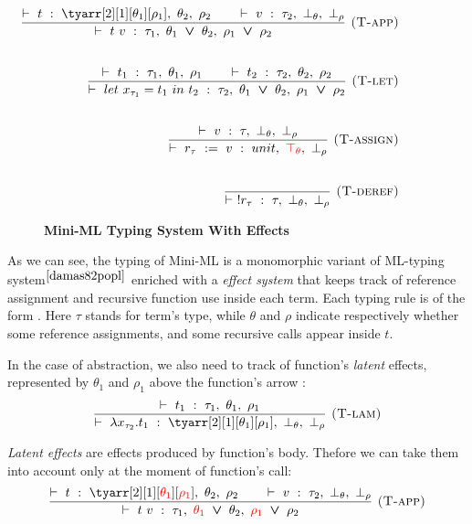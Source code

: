 \documentclass[a4paper,11pt,oneside]{article}
\theoremstyle{plain}
\newcommand{\bvee}{\boldsymbol{~\vee~}}
\newcommand{\typing}[4]{\vdash~#1~:~#2,~#3,~#4}
\newcommand{\bth}{\bot_\theta}
\newcommand{\brh}{\bot_\rho}
\newcommand{\tth}{\top_\theta}
\begin{document}
\begin{figure}[H]
\begin{adjustwidth}{-0em}{-1em}
\begin{small}
\begin{minipage}[t]{0.49\linewidth}
\begin{displaymath}
\begin{array}{rrr}
\hspace*{-1.5cm}
\dfrac
	{
		\typing{t}{\tyarr[2][1][\theta_1][\rho_1]}{\theta_2}{\rho_2} \qquad
		\typing{v}{\tau_2}{\bth}{\brh}}
	{
		\typing{t~v}{\tau_1}{\theta_1 \bvee \theta_2}{\rho_1 \bvee \rho_2}}
	{
		\textsc{  (T-app)}} \\[1cm]	
\hspace*{-1cm}				
\dfrac
	{
		\typing{t_1}{\tau_1}{\theta_1}{\rho_1} \qquad
		\typing{t_2}{\tau_2}{\theta_2}{\rho_2}
	}
	{\typing
		{let~x_{\tau_1} = t_1~in~t_2}
		{\tau_2}
		{\theta_1 \bvee \theta_2}
		{\rho_1 \bvee \rho_2}}
	{\textsc{  (T-let)}} \\[1cm]	
					


\hspace*{1cm}		
\dfrac
	{\typing{v}{\tau}{\bth}{\brh}}
	{\typing{r_{\tau}~:=~v}
		{unit}
		{\textcolor{red}{\tth}}
		{\brh}} 			
 	{\textsc{  (T-assign)}}	\\[1cm]		
\hspace*{2.5cm}		   			
\dfrac
	{}
	{\typing{!r_{\tau}}{\tau}{\bth}{\brh}} 
{\textsc{  (T-deref)}}

\end{array}
\end{displaymath}
\end{minipage} 	 		 
\end{small}
\end{adjustwidth}
\caption{\textbf{Mini-ML Typing System With Effects}}
\label{mini-ml-def-typ}	
\end{figure}    
	As we can see, the typing of Mini-ML is a monomorphic variant of ML-typing system$^{\cite{damas82popl}}$ enriched with a \textit{effect system} that keeps track of reference assignment and recursive function use inside each term.		
	Each typing rule is of the form . 
  Here $\tau$ stands for term's type, while $\theta$ and $\rho$ indicate respectively whether some reference assignments, and some recursive calls appear inside $t$.
 
  In the case of abstraction, we also need to track of function's \textit{latent} effects, represented by $\theta_1$ and $\rho_1$ above the function's arrow :
  $$
  \dfrac
	{\typing{t_1}{\tau_1}{\theta_1}{\rho_1}}
	{\typing{\lambda x_{\tau_2} . t_1}
		{\tyarr[2][1][\theta_1][\rho_1]}{\bth}{\brh}}
	{\textsc{  (T-lam)}} $$	 
  
  \textit{Latent effects} are effects produced by function's body. 
  Thefore we can take them into account only at the moment of function's call:
  $$\dfrac
	{
		\typing{t}{\tyarr[2][1][\textcolor{red}{\theta_1}][\textcolor{red}{\rho_1}]}{\theta_2}{\rho_2} \qquad
		\typing{v}{\tau_2}{\bth}{\brh}}
	{
		\typing{t~v}{\tau_1}{\textcolor{red}{\theta_1} \bvee \theta_2}{\textcolor{red}{\rho_1} \bvee \rho_2}}
	{
		\textsc{  (T-app)}} $$
\end{document}
